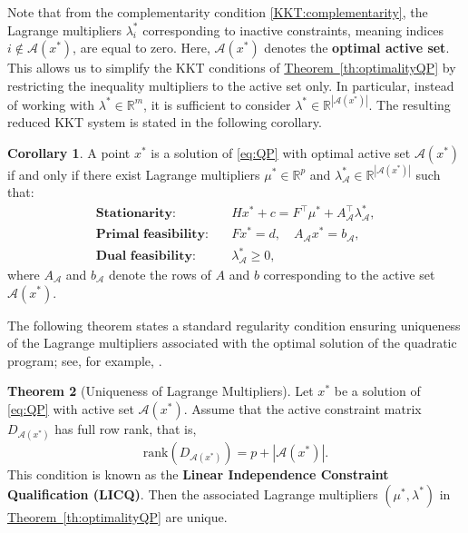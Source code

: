 \documentclass{book}
\theoremstyle{definition}
\newtheorem{theorem}{Theorem}[section]
\newtheorem{cor}[theorem]{Corollary}
\newcommand{\thref}[1]{\hyperref[#1]{Theorem~\ref*{#1}}}
\numberwithin{algorithm_}{chapter}
\begin{document}
Note that from the complementarity condition \eqref{KKT:complementarity}, the Lagrange multipliers $\lambda_i^*$ corresponding to inactive constraints, meaning indices $i \notin \mathcal{A}(x^*)$, are equal to zero.  
Here, $\mathcal{A}(x^*)$ denotes the \textbf{optimal active set}.  
This allows us to simplify the KKT conditions of \thref{th:optimalityQP} by restricting the inequality multipliers to the active set only. In particular, instead of working with $\lambda^* \in \mathbb{R}^m$, it is sufficient to consider $\lambda^* \in \mathbb{R}^{|\mathcal{A}(x^*)|}$. The resulting reduced KKT system is stated in the following corollary.

\begin{cor} \label{cor:reducedKKT}
A point \(x^*\) is a solution of \eqref{eq:QP} with optimal active set \(\mathcal{A}(x^*)\) if and only if there exist Lagrange multipliers \(\mu^* \in \mathbb{R}^p\) and \(\lambda_{\mathcal{A}}^* \in \mathbb{R}^{|\mathcal{A}(x^*)|}\) such that:
\begin{subequations}
\begin{align}
\textbf{Stationarity:} \quad & H x^* + c = F^\top \mu^* +  A_{\mathcal{A}}^\top \lambda_{\mathcal{A}}^*, \label{RKKT:stationarity} \\[1mm]
\textbf{Primal feasibility:} \quad & F x^* = d, \quad A_{\mathcal{A}} x^* = b_{\mathcal{A}}, \label{RKKT:primal} \\[1mm]
\textbf{Dual feasibility:} \quad & \lambda_{\mathcal{A}}^* \ge 0, \label{RKKT:dual}
\end{align}
\end{subequations}
where \(A_{\mathcal{A}}\) and \(b_{\mathcal{A}}\) denote the rows of \(A\) and \(b\) corresponding to the active set \(\mathcal{A}(x^*)\). 
\end{cor} 

\bigskip

The following theorem states a standard regularity condition ensuring uniqueness of the Lagrange multipliers associated with the optimal solution of the quadratic program; see, for example, \cite{nocedal2006numerical}.

\begin{theorem}[Uniqueness of Lagrange Multipliers] \label{th:uniqueLagrange}
Let $x^*$ be a solution of \eqref{eq:QP} with active set $\mathcal{A}(x^*)$.  
Assume that the active constraint matrix $D_{\mathcal{A}(x^*)}$ has full row rank, that is,
\begin{equation}
\mathrm{rank}(D_{\mathcal{A}(x^*)}) = p + |\mathcal{A}(x^*)|.
\end{equation}
This condition is known as the \textbf{Linear Independence Constraint Qualification (LICQ)}.  
Then the associated Lagrange multipliers $(\mu^*, \lambda^*)$ in \thref{th:optimalityQP} are unique.

\end{theorem}
\end{document}

